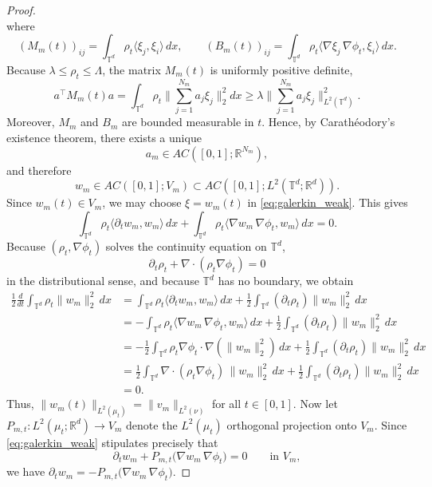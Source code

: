 \documentclass[11pt]{article}
\begin{document}
\begin{proof}
\[    \]
    where
    \[
    (M_m(t))_{ij}=\int_{\mathbb T^d}\rho_t \langle \xi_j,\xi_i\rangle\,dx,
    \qquad
    (B_m(t))_{ij}=\int_{\mathbb T^d}\rho_t \langle \nabla \xi_j\,\nabla\phi_t,\xi_i\rangle\,dx.
    \]
    Because $\lambda\le \rho_t\le \Lambda$, the matrix $M_m(t)$ is uniformly positive definite,
    \[
    a^\top M_m(t)a
    =\int_{\mathbb T^d}\rho_t \Big\|\sum_{j=1}^{N_m} a_j \xi_j\Big\|_2^2 dx
    \ge \lambda \Big\|\sum_{j=1}^{N_m} a_j\xi_j\Big\|_{L^2(\mathbb T^d)}^2.
    \]
    Moreover, $M_m$ and $B_m$ are bounded measurable in $t$. Hence, by Carath\'eodory's existence theorem, there exists a unique
    \[
    a_m\in AC([0,1];\mathbb R^{N_m}),
    \]
    and therefore
    \[
    w_m\in AC([0,1];V_m)\subset AC([0,1];L^2(\mathbb T^d;\mathbb R^d)).
    \]
    Since $w_m(t)\in V_m$, we may choose $\xi=w_m(t)$ in \cref{eq:galerkin_weak}. This gives
    \[
    \int_{\mathbb T^d}\rho_t \langle \partial_t w_m,w_m\rangle\,dx
    +
    \int_{\mathbb T^d}\rho_t \langle \nabla w_m\,\nabla\phi_t,w_m\rangle\,dx
    =0.
    \]
    Because $(\rho_t,\nabla\phi_t)$ solves the continuity equation on $\mathbb T^d$,
    \[
    \partial_t\rho_t+\nabla\cdot(\rho_t\nabla\phi_t)=0
    \]
    in the distributional sense, and because $\mathbb T^d$ has no boundary, we obtain
    \begin{align*}
    \frac{1}{2}\frac{d}{dt}\int_{\mathbb T^d} \rho_t \|w_m\|_2^2\,dx
    &=
    \int_{\mathbb T^d}\rho_t \langle \partial_t w_m,w_m\rangle\,dx
    +\frac12\int_{\mathbb T^d}(\partial_t\rho_t)\|w_m\|_2^2\,dx\\
    &=
    -\int_{\mathbb T^d}\rho_t \langle \nabla w_m\,\nabla\phi_t,w_m\rangle\,dx
    +\frac12\int_{\mathbb T^d}(\partial_t\rho_t)\|w_m\|_2^2\,dx\\
    &=
    -\frac12\int_{\mathbb T^d}\rho_t \nabla\phi_t\cdot\nabla(\|w_m\|_2^2)\,dx
    +\frac12\int_{\mathbb T^d}(\partial_t\rho_t)\|w_m\|_2^2\,dx\\
    &=
    \frac12\int_{\mathbb T^d}\nabla\cdot(\rho_t\nabla\phi_t)\,\|w_m\|_2^2\,dx
    +\frac12\int_{\mathbb T^d}(\partial_t\rho_t)\|w_m\|_2^2\,dx\\
    &=0.
    \end{align*}
    Thus, $\|w_m(t)\|_{L^2(\mu_t)}=\|v_m\|_{L^2(\nu)} $ for all $t\in[0,1].$ Now let $P_{m,t}:L^2(\mu_t;\mathbb R^d)\to V_m$ denote the $L^2(\mu_t)$ orthogonal projection
    onto $V_m$. Since \cref{eq:galerkin_weak} stipulates precisely that
    \[
    \partial_t w_m + P_{m,t}\bigl(\nabla w_m\,\nabla\phi_t\bigr)=0
    \qquad\text{in }V_m,
    \]
    we have $\partial_t w_m = - P_{m,t}\bigl(\nabla w_m\,\nabla\phi_t\bigr).$

\end{proof}
\end{document}
